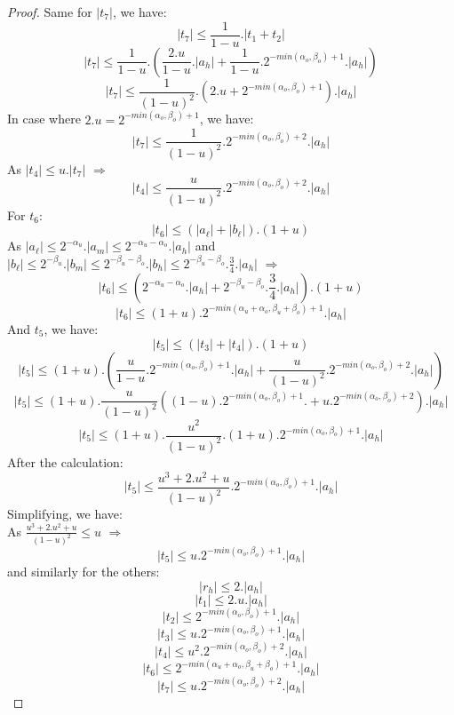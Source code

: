 \begin{proof}
Same for $\lvert t_7 \rvert $, we have:
$$\lvert t_7 \rvert \le \frac{1}{1-u}. \lvert t_1 + t_2 \rvert $$
$$\lvert t_7 \rvert \le \frac{1}{1-u}. (\frac{2.u}{1-u}. \lvert a_h \rvert + \frac{1}{1-u}.2^{-min(\alpha_o,\beta_o)+1}.\lvert a_h \rvert) $$
$$\lvert t_7 \rvert \le \frac{1}{(1-u)^2}. (2.u+ 2^{-min(\alpha_o,\beta_o)+1}). \lvert a_h \rvert  $$
In case where $2.u = 2^{-min(\alpha_o,\beta_o)+1}$, we have:
$$\lvert t_7 \rvert \le \frac{1}{(1-u)^2}.  2^{-min(\alpha_o,\beta_o)+2}. \lvert a_h \rvert  $$
As $\lvert t_4 \rvert \le u. \lvert t_7 \rvert $ $\Rightarrow$
$$\lvert t_4 \rvert \le \frac{u}{(1-u)^2}.  2^{-min(\alpha_o,\beta_o)+2}. \lvert a_h \rvert  $$
For $t_6$:
$$\lvert t_6 \rvert \le (\lvert a_{\ell} \rvert + \lvert b_{\ell} \rvert).(1+u) $$
As $\lvert a_{\ell} \rvert \le 2^{-\alpha_u} .\lvert a_m \rvert  \le 2^{-\alpha_u -\alpha_o} .\lvert a_h \rvert $ and $\lvert b_{\ell} \rvert \le 2^{-\beta_u} .\lvert b_m \rvert \le  2^{-\beta_u -\beta_o} .\lvert b_h \rvert \le  2^{-\beta_u -\beta_o}.\frac{3}{4} .\lvert a_h \rvert$ $\Rightarrow$
$$\lvert t_6 \rvert \le (2^{-\alpha_u -\alpha_o} .\lvert a_h \rvert + 2^{-\beta_u -\beta_o}.\frac{3}{4} .\lvert a_h \rvert).(1+u)$$
$$\lvert t_6 \rvert \le (1+u).2^{-min(\alpha_u +\alpha_o,\beta_u +\beta_o)+1} .\lvert a_h \rvert $$
And $t_5$, we have:
$$\lvert t_5 \rvert \le (\lvert t_3 \rvert + \lvert t_4 \rvert ).(1+u)$$
$$\lvert t_5 \rvert \le (1+u).(\frac{u}{1-u}.2^{-min(\alpha_o,\beta_o)+1}. \lvert a_h \rvert +   \frac{u}{(1-u)^2}.  2^{-min(\alpha_o,\beta_o)+2}. \lvert a_h \rvert )$$
$$\lvert t_5 \rvert \le (1+u).\frac{u}{(1-u)^2}((1-u).2^{-min(\alpha_o,\beta_o)+1}. + u.  2^{-min(\alpha_o,\beta_o)+2}). \lvert a_h \rvert $$
$$\lvert t_5 \rvert \le (1+u).\frac{u^2}{(1-u)^2}.(1+u).2^{-min(\alpha_o,\beta_o)+1}. \lvert a_h \rvert $$
After the calculation:
$$\lvert t_5 \rvert \le \frac{u^3+2.u^2+u}{(1-u)^2}.2^{-min(\alpha_o,\beta_o)+1}. \lvert a_h \rvert $$
Simplifying, we have:\\
As $\frac{u^3+2.u^2+u}{(1-u)^2} \le u$ $\Rightarrow$
$$\lvert t_5 \rvert \le u.2^{-min(\alpha_o,\beta_o)+1}. \lvert a_h \rvert $$ 
and similarly for the others:
$$\lvert r_h \rvert \le 2 .\lvert a_h \rvert$$
$$\lvert t_1 \rvert \le 2.u. \lvert a_h \rvert$$
$$\lvert t_2 \rvert \le 2^{-min(\alpha_o,\beta_o)+1} . \lvert a_h \rvert $$
$$\lvert t_3 \rvert \le u.2^{-min(\alpha_o,\beta_o)+1}. \lvert a_h \rvert $$
$$\lvert t_4 \rvert \le u^2. 2^{-min(\alpha_o,\beta_o)+2}. \lvert a_h \rvert  $$
$$\lvert t_6 \rvert \le 2^{-min(\alpha_u +\alpha_o,\beta_u +\beta_o)+1} .\lvert a_h \rvert $$
$$\lvert t_7 \rvert \le u. 2^{-min(\alpha_o,\beta_o)+2}. \lvert a_h \rvert $$

\end{proof}
